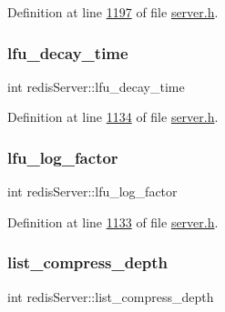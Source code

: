 Definition at line \hyperlink{server_8h_source_l01197}{1197} of file \hyperlink{server_8h_source}{server.\+h}.

\mbox{\label{structredisServer_ab034f33149c94c13f0353792f3224b0d}} 
\subsubsection{\texorpdfstring{lfu\+\_\+decay\+\_\+time}{lfu\_decay\_time}}
{\footnotesize\ttfamily int redis\+Server\+::lfu\+\_\+decay\+\_\+time}



Definition at line \hyperlink{server_8h_source_l01134}{1134} of file \hyperlink{server_8h_source}{server.\+h}.

\mbox{\label{structredisServer_a46d1038b76afb523ddc638d017d017f9}} 
\subsubsection{\texorpdfstring{lfu\+\_\+log\+\_\+factor}{lfu\_log\_factor}}
{\footnotesize\ttfamily int redis\+Server\+::lfu\+\_\+log\+\_\+factor}



Definition at line \hyperlink{server_8h_source_l01133}{1133} of file \hyperlink{server_8h_source}{server.\+h}.

\mbox{\label{structredisServer_ab55f72456666ce0237329210ef8442fb}} 
\subsubsection{\texorpdfstring{list\+\_\+compress\+\_\+depth}{list\_compress\_depth}}
{\footnotesize\ttfamily int redis\+Server\+::list\+\_\+compress\+\_\+depth}



